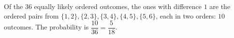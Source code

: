 Of the $36$ equally likely ordered outcomes, the ones with difference $1$ are the ordered pairs from $\{1,2\},\{2,3\},\{3,4\},\{4,5\},\{5,6\}$, each in two orders: $10$ outcomes. The probability is $\dfrac{10}{36}=\boxed{\dfrac{5}{18}}$.
